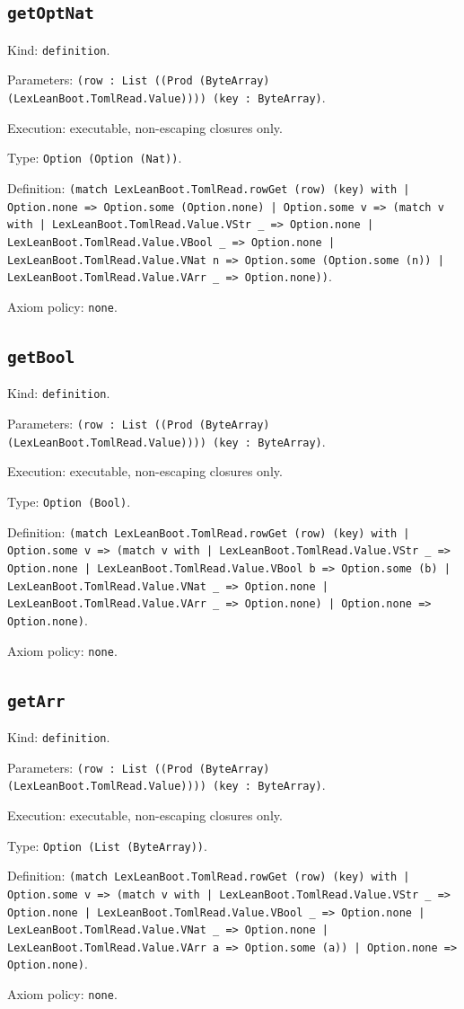 \documentclass[11pt]{article}
\begin{document}
\subsection*{\texttt{getOptNat}}
\noindent Kind: \texttt{definition}.\par
\noindent Parameters: \texttt{(row : List ((Prod (ByteArray) (LexLeanBoot.TomlRead.Value)))) (key : ByteArray)}.\par
\noindent Execution: executable, non-escaping closures only.\par
\noindent Type: \texttt{Option (Option (Nat))}.\par
\noindent Definition: \texttt{(match LexLeanBoot.TomlRead.rowGet (row) (key) with | Option.none => Option.some (Option.none) | Option.some v => (match v with | LexLeanBoot.TomlRead.Value.VStr \_ => Option.none | LexLeanBoot.TomlRead.Value.VBool \_ => Option.none | LexLeanBoot.TomlRead.Value.VNat n => Option.some (Option.some (n)) | LexLeanBoot.TomlRead.Value.VArr \_ => Option.none))}.\par
\noindent Axiom policy: \texttt{none}.\par
\subsection*{\texttt{getBool}}
\noindent Kind: \texttt{definition}.\par
\noindent Parameters: \texttt{(row : List ((Prod (ByteArray) (LexLeanBoot.TomlRead.Value)))) (key : ByteArray)}.\par
\noindent Execution: executable, non-escaping closures only.\par
\noindent Type: \texttt{Option (Bool)}.\par
\noindent Definition: \texttt{(match LexLeanBoot.TomlRead.rowGet (row) (key) with | Option.some v => (match v with | LexLeanBoot.TomlRead.Value.VStr \_ => Option.none | LexLeanBoot.TomlRead.Value.VBool b => Option.some (b) | LexLeanBoot.TomlRead.Value.VNat \_ => Option.none | LexLeanBoot.TomlRead.Value.VArr \_ => Option.none) | Option.none => Option.none)}.\par
\noindent Axiom policy: \texttt{none}.\par
\subsection*{\texttt{getArr}}
\noindent Kind: \texttt{definition}.\par
\noindent Parameters: \texttt{(row : List ((Prod (ByteArray) (LexLeanBoot.TomlRead.Value)))) (key : ByteArray)}.\par
\noindent Execution: executable, non-escaping closures only.\par
\noindent Type: \texttt{Option (List (ByteArray))}.\par
\noindent Definition: \texttt{(match LexLeanBoot.TomlRead.rowGet (row) (key) with | Option.some v => (match v with | LexLeanBoot.TomlRead.Value.VStr \_ => Option.none | LexLeanBoot.TomlRead.Value.VBool \_ => Option.none | LexLeanBoot.TomlRead.Value.VNat \_ => Option.none | LexLeanBoot.TomlRead.Value.VArr a => Option.some (a)) | Option.none => Option.none)}.\par
\noindent Axiom policy: \texttt{none}.\par
\end{document}
